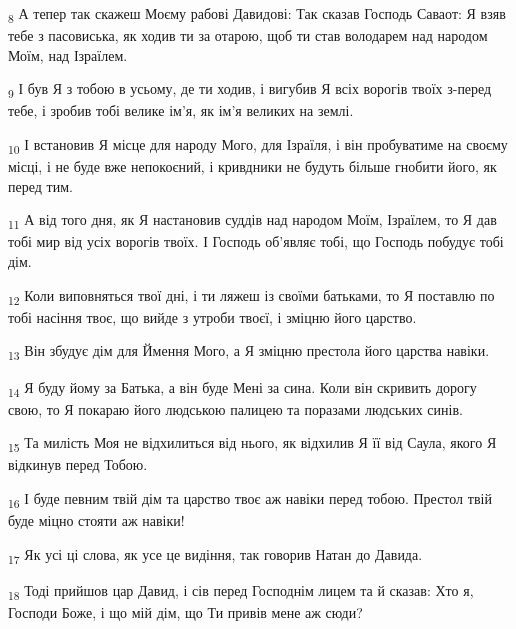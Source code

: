 \begin{tcolorbox}
\textsubscript{8} А тепер так скажеш Моєму рабові Давидові: Так сказав Господь Саваот: Я взяв тебе з пасовиська, як ходив ти за отарою, щоб ти став володарем над народом Моїм, над Ізраїлем.
\end{tcolorbox}
\begin{tcolorbox}
\textsubscript{9} І був Я з тобою в усьому, де ти ходив, і вигубив Я всіх ворогів твоїх з-перед тебе, і зробив тобі велике ім'я, як ім'я великих на землі.
\end{tcolorbox}
\begin{tcolorbox}
\textsubscript{10} І встановив Я місце для народу Мого, для Ізраїля, і він пробуватиме на своєму місці, і не буде вже непокоєний, і кривдники не будуть більше гнобити його, як перед тим.
\end{tcolorbox}
\begin{tcolorbox}
\textsubscript{11} А від того дня, як Я настановив суддів над народом Моїм, Ізраїлем, то Я дав тобі мир від усіх ворогів твоїх. І Господь об'являє тобі, що Господь побудує тобі дім.
\end{tcolorbox}
\begin{tcolorbox}
\textsubscript{12} Коли виповняться твої дні, і ти ляжеш із своїми батьками, то Я поставлю по тобі насіння твоє, що вийде з утроби твоєї, і зміцню його царство.
\end{tcolorbox}
\begin{tcolorbox}
\textsubscript{13} Він збудує дім для Ймення Мого, а Я зміцню престола його царства навіки.
\end{tcolorbox}
\begin{tcolorbox}
\textsubscript{14} Я буду йому за Батька, а він буде Мені за сина. Коли він скривить дорогу свою, то Я покараю його людською палицею та поразами людських синів.
\end{tcolorbox}
\begin{tcolorbox}
\textsubscript{15} Та милість Моя не відхилиться від нього, як відхилив Я її від Саула, якого Я відкинув перед Тобою.
\end{tcolorbox}
\begin{tcolorbox}
\textsubscript{16} І буде певним твій дім та царство твоє аж навіки перед тобою. Престол твій буде міцно стояти аж навіки!
\end{tcolorbox}
\begin{tcolorbox}
\textsubscript{17} Як усі ці слова, як усе це видіння, так говорив Натан до Давида.
\end{tcolorbox}
\begin{tcolorbox}
\textsubscript{18} Тоді прийшов цар Давид, і сів перед Господнім лицем та й сказав: Хто я, Господи Боже, і що мій дім, що Ти привів мене аж сюди?
\end{tcolorbox}
